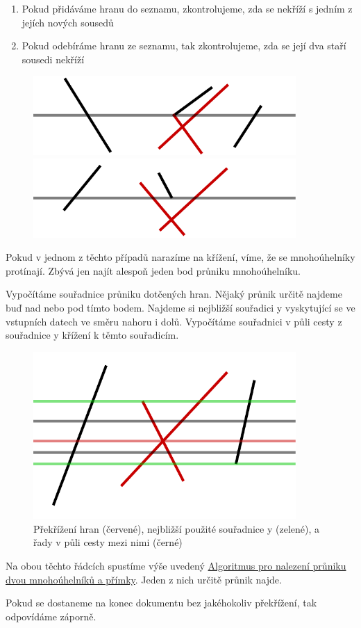 \documentclass{article}
\begin{document}
\begin{enumerate}
    \item Pokud přidáváme hranu do seznamu, zkontrolujeme, zda se nekříží s jedním z jejích nových sousedů
    \item Pokud odebíráme hranu ze seznamu, tak zkontrolujeme, zda se její dva staří sousedi nekříží
\end{enumerate}

\begin{figure}[h] \centering
    \includegraphics[width=10cm]{images/line.002.pdf}
    \includegraphics[width=10cm]{images/line.003.pdf}
\end{figure}

Pokud v jednom z těchto případů narazíme na křížení, víme, že se mnohoúhelníky protínají. Zbývá jen najít alespoň jeden bod průniku mnohoúhelníku.

Vypočítáme souřadnice průniku dotčených hran. Nějaký průnik určitě najdeme buď nad nebo pod tímto bodem. Najdeme si nejbližší souřadici y vyskytující se ve vstupních datech ve směru nahoru i dolů. Vypočítáme souřadnici v půli cesty z souřadnice y křížení k těmto souřadicím.

\begin{figure}[h] \centering
    \includegraphics[width=10cm]{images/search.pdf}
    \linebreak
    Překřížení hran (červené), nejbližší použité souřadnice y (zelené), a řady v půli cesty mezi nimi (černé)
\end{figure}

Na obou těchto řádcích spustíme výše uvedený \hyperref[sec:findOnLine]{Algoritmus pro nalezení průniku dvou mnohoúhelníků a přímky}. Jeden z nich určitě průnik najde.

Pokud se dostaneme na konec dokumentu bez jakéhokoliv překřížení, tak odpovídáme záporně.
\end{document}
